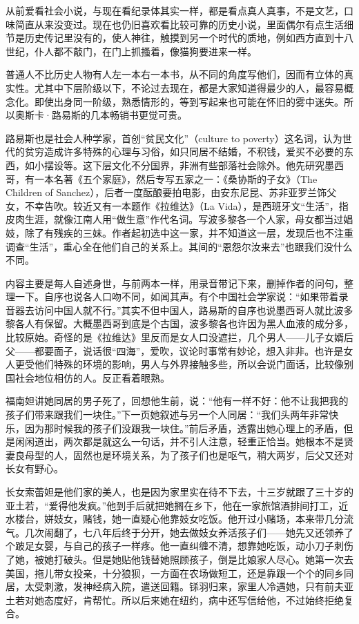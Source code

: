 \par 从前爱看社会小说，与现在看纪录体其实一样，都是看点真人真事，不是文艺，口味简直从来没变过。现在也仍旧喜欢看比较可靠的历史小说，里面偶尔有点生活细节是历史传记里没有的，使人神往，触摸到另一个时代的质地，例如西方直到十八世纪，仆人都不敲门，在门上抓搔着，像猫狗要进来一样。
\par 普通人不比历史人物有人左一本右一本书，从不同的角度写他们，因而有立体的真实性。尤其中下层阶级以下，不论过去现在，都是大家知道得最少的人，最容易概念化。即使出身同一阶级，熟悉情形的，等到写起来也可能在怀旧的雾中迷失。所以奥斯卡·路易斯的几本畅销书更觉可贵。
\par 路易斯也是社会人种学家，首创“贫民文化”（culture to poverty）这名词，认为世代的贫穷造成许多特殊的心理与习俗，如只同居不结婚，不积钱，爱买不必要的东西，如小摆设等。这下层文化不分国界，非洲有些部落社会除外。他先研究墨西哥，有一本名著《五个家庭》，然后专写五家之一：《桑协斯的子女》（The Children of Sanchez），后者一度酝酿要拍电影，由安东尼昆、苏非亚罗兰饰父女，不幸告吹。较近又有一本题作《拉维达》（La Vida），是西班牙文“生活”，指皮肉生涯，就像江南人用“做生意”作代名词。写波多黎各一个人家，母女都当过娼妓，除了有残疾的三妹。作者起初选中这一家，并不知道这一层，发现后也不注重调查“生活”，重心全在他们自己的关系上。其间的“恩怨尔汝来去”也跟我们没什么不同。
\par 内容主要是每人自述身世，与前两本一样，用录音带记下来，删掉作者的问句，整理一下。自序也说各人口吻不同，如闻其声。有个中国社会学家说：“如果带着录音器去访问中国人就不行。”其实不但中国人，路易斯的自序也说墨西哥人就比波多黎各人有保留。大概墨西哥到底是个古国，波多黎各也许因为黑人血液的成分多，比较原始。奇怪的是《拉维达》里反而是女人口没遮拦，几个男人——儿子女婿后父——都要面子，说话很“四海”，爱吹，议论时事常有妙论，想入非非。也许是女人更受他们特殊的环境的影响，男人与外界接触多些，所以会说门面话，比较像别国社会地位相仿的人。反正看着眼熟。
\par 福南妲讲她同居的男子死了，回想他生前，说：“他有一样不好：他不让我把我的孩子们带来跟我们一块住。”下一页她叙述与另一个人同居：“我们头两年非常快乐，因为那时候我的孩子们没跟我一块住。”前后矛盾，透露出她心理上的矛盾，但是闲闲道出，两次都是就这么一句话，并不引人注意，轻重正恰当。她根本不是贤妻良母型的人，固然也是环境关系，为了孩子们也是呕气，稍大两岁，后父又还对长女有野心。
\par 长女索蕾妲是他们家的美人，也是因为家里实在待不下去，十三岁就跟了三十岁的亚土若，“爱得他发疯。”他到手后就把她搁在乡下，他在一家旅馆酒排间打工，近水楼台，姘妓女，赌钱，她一直疑心他靠妓女吃饭。他开过小赌场，本来带几分流气。几次闹翻了，七八年后终于分开，她去做妓女养活孩子们——她先又还领养了个跛足女婴，与自己的孩子一样疼。他一直纠缠不清，想靠她吃饭，动小刀子刺伤了她，被她打破头。但是她贴他钱替她照顾孩子，倒是比娘家人尽心。她第一次去美国，拖儿带女投亲，十分狼狈，一方面在农场做短工，还是靠跟一个个的同乡同居，太受刺激，发神经病入院，遣送回籍。铩羽归来，家里人冷遇她，只有前夫亚土若对她态度好，肯帮忙。所以后来她在纽约，病中还写信给他，不过始终拒绝复合。
